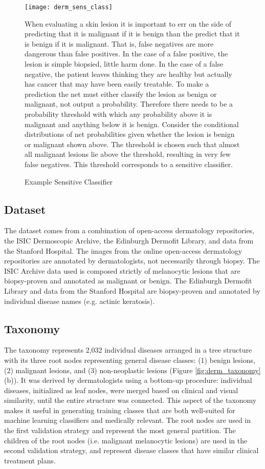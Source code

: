 \begin{figure}
\texttt{[image: derm\_sens\_class]}
\caption{Example Sensitive Classifier}
\vspace{12px}
When evaluating a skin lesion it is important to err on the side of predicting that it is malignant if it is benign than the predict that it is benign if it is malignant.  That is, false negatives are more dangerous than false positives.  In the case of a false positive, the lesion is simple biopsied, little harm done.  In the case of a false negative, the patient leaves thinking they are healthy but actually has cancer that may have been easily treatable.  To make a prediction the net must either classify the lesion as benign or malignant, not output a probability.  Therefore there needs to be a probability threshold with which any probability above it is malignant and anything below it is benign.  Consider the conditional distributions of net probabilities given whether the lesion is benign or malignant shown above.  The threshold is chosen such that almost all malignant lesions lie above the threshold, resulting in very few false negatives.  This threshold corresponds to a sensitive classifier.
\label{fig:derm_sens_class}
\end{figure}

\subsection{Dataset}
The dataset comes from a combination of open-access dermatology repositories, the ISIC Dermoscopic Archive, the Edinburgh Dermofit Library, and data from the Stanford Hospital. The images from the online open-access dermatology repositories are annotated by dermatologists, not necessarily through biopsy. The ISIC Archive data used is composed strictly of melanocytic lesions that are biopsy-proven and annotated as malignant or benign. The Edinburgh Dermofit Library and data from the Stanford Hospital are biopsy-proven and annotated by individual disease names (e.g. actinic keratosis). 

\subsection{Taxonomy}
The taxonomy represents 2,032 individual diseases arranged in a tree structure with its three root nodes representing general disease classes: (1) benign lesions, (2) malignant lesions, and (3) non-neoplastic lesions (Figure \ref{fig:derm_taxonomy}(b)). It was derived by dermatologists using a bottom-up procedure: individual diseases, initialized as leaf nodes, were merged based on clinical and visual similarity, until the entire structure was connected. This aspect of the taxonomy makes it useful in generating training classes that are both well-suited for machine learning classifiers and medically relevant. The root nodes are used in the first validation strategy and represent the most general partition. The children of the root nodes (i.e. malignant melanocytic lesions) are used in the second validation strategy, and represent disease classes that have similar clinical treatment plans.

